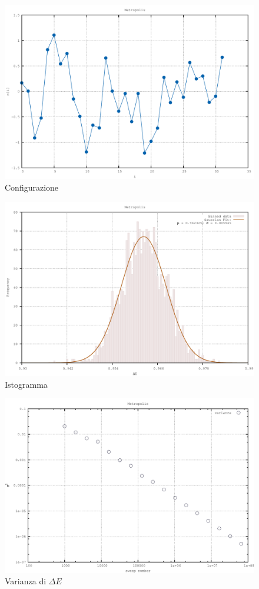 \begin{figure}[h]
\centering
\includegraphics[width=\textwidth]{configuration}
\caption{Configurazione}
\label{fig:configuration}
\end{figure}

\begin{figure}[h]
\centering
\includegraphics[width=\textwidth]{histogram}
\caption{Istogramma}
\label{fig:histogram}
\end{figure}

\begin{figure}[h]
\centering
\includegraphics[width=\textwidth]{variance}
\caption{Varianza di $\Delta E$}
\label{fig:variance}
\end{figure}

